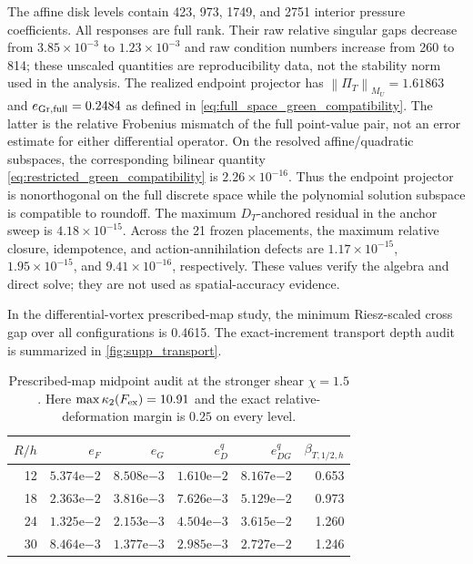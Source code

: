 \documentclass[11pt]{article}
\theoremstyle{plain}
\theoremstyle{definition}
\theoremstyle{remark}
\newcommand{\norm}[2][]{\left\lVert #2\right\rVert_{#1}}
\begin{document}
The affine disk
levels contain 423, 973, 1749, and 2751 interior pressure coefficients.  All
responses are full rank.  Their raw relative singular gaps decrease from
$3.85\times10^{-3}$ to $1.23\times10^{-3}$ and raw condition numbers increase
from 260 to 814; these unscaled quantities are reproducibility data, not the
stability norm used in the analysis.  The realized endpoint projector has
$\norm[M_U]{\Pi_T}=1.61863$ and
$e_{{\rm Gr},{\rm full}}=0.2484$ as defined in
\eqref{eq:full_space_green_compatibility}.  The latter is the relative
Frobenius mismatch of the full point-value pair, not an error estimate for
either differential operator.  On the resolved affine/quadratic subspaces,
the corresponding bilinear quantity
\eqref{eq:restricted_green_compatibility} is $2.26\times10^{-16}$.
Thus the endpoint projector is nonorthogonal on the full discrete space while
the polynomial solution subspace is compatible to roundoff.
The maximum $D_T$-anchored residual in the anchor sweep is
$4.18\times10^{-15}$.  Across the 21 frozen placements, the maximum relative
closure, idempotence, and action-annihilation defects are
$1.17\times10^{-15}$, $1.95\times10^{-15}$, and $9.41\times10^{-16}$,
respectively.  These values verify the algebra and direct solve; they are not
used as spatial-accuracy evidence.

In the differential-vortex prescribed-map study, the minimum Riesz-scaled
cross gap over all configurations is 0.4615.  The exact-increment transport
depth audit is summarized in \cref{fig:supp_transport}.

\begin{table}[ht]
\centering
\caption{Prescribed-map midpoint audit at the stronger shear $\chi=1.5$.
Here $\max\kappa_2(F_{\rm ex})=10.91$ and the exact relative-deformation
margin is $0.25$ on every level.}
\label{tab:supp_strong_shear}
\begin{tabular}{rrrrrr}
\toprule
$R/h$ & $e_F$ & $e_G$ & $e_D^q$ & $e_{DG}^q$ & $\beta_{T,1/2,h}$ \\
\midrule
12 & $5.374\mathrm e{-2}$ & $8.508\mathrm e{-3}$ & $1.610\mathrm e{-2}$ & $8.167\mathrm e{-2}$ & 0.653 \\
18 & $2.363\mathrm e{-2}$ & $3.816\mathrm e{-3}$ & $7.626\mathrm e{-3}$ & $5.129\mathrm e{-2}$ & 0.973 \\
24 & $1.325\mathrm e{-2}$ & $2.153\mathrm e{-3}$ & $4.504\mathrm e{-3}$ & $3.615\mathrm e{-2}$ & 1.260 \\
30 & $8.464\mathrm e{-3}$ & $1.377\mathrm e{-3}$ & $2.985\mathrm e{-3}$ & $2.727\mathrm e{-2}$ & 1.246 \\
\bottomrule
\end{tabular}
\end{table}
\end{document}

